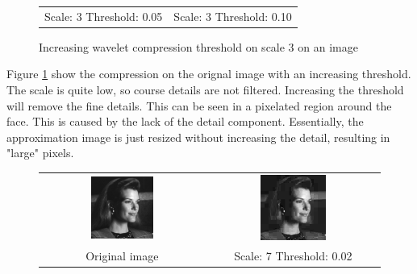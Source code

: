 \documentclass[a4paper]{article}
\begin{document}
\begin{enumerate}
\begin{figure}[H]
\begin{tabular}{cc}
 Scale: 3 Threshold: 0.05 & Scale: 3 Threshold: 0.10 
\end{tabular}
\caption{Increasing wavelet compression threshold on scale 3 on an image}
\label{fig:scale3}
\end{figure}

Figure \ref{fig:scale3} show the compression on the orignal image with an increasing threshold.
The scale is quite low, so course details are not filtered. Increasing the threshold will remove the fine details.
This can be seen in a pixelated region around the face. This is caused by the lack of the detail component.
Essentially, the approximation image is just resized without increasing the detail, resulting in "large" pixels.

\begin{figure}[H]
\centering
\begin{tabular}{cc}
 \includegraphics[width=0.4\textwidth]{../lab3ex3/tracy.png} & \includegraphics[width=0.4\textwidth]{../lab3ex3/l7t002.png} \\
 Original image & Scale: 7 Threshold: 0.02 \\

\end{tabular}
\end{figure}
\end{enumerate}
\end{document}
